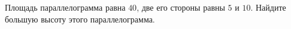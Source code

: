 \begin{ex}
	\begin{condition}
		Площадь параллелограмма равна \( 40 \), две его стороны равны \( 5 \) и \( 10 \). Найдите большую высоту этого параллелограмма.
	\end{condition}
\end{ex}